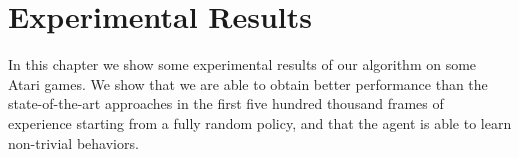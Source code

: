 \chapter{Experimental Results}
\label{ch6_exp}
\thispagestyle{empty}

\vspace{0.5cm}

In this chapter we show some experimental results of our algorithm on some Atari
games.
We show that we are able to obtain better performance than the state-of-the-art
approaches in the first five hundred thousand frames of experience starting 
from a fully random policy, and that the agent is able to learn non-trivial 
behaviors.



